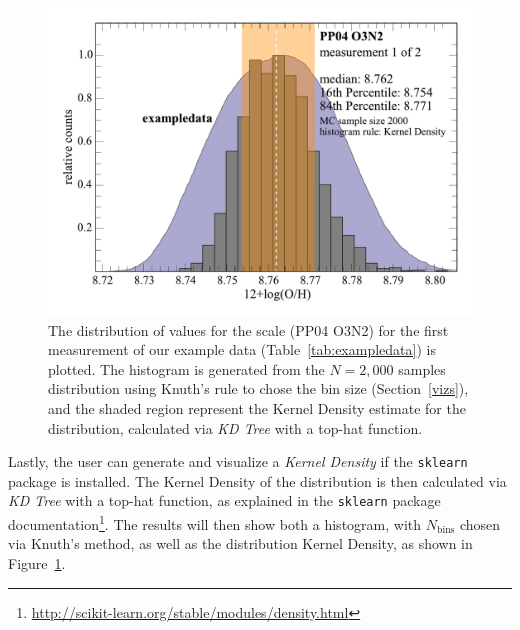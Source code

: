 \documentclass{emulateapj}
\begin{document}
\begin{figure}[ht!]
  \includegraphics[width=1.0\columnwidth]{exampledata_n2000_PP04_O3N2_1KDE.pdf}
   \caption{The distribution of values for the \citet{pettini04} scale (PP04 O3N2) for the first measurement of our example data (Table~\ref{tab:exampledata}) is plotted. The histogram is generated from the $N=2,000$ samples distribution using Knuth's rule to chose the bin size (Section~\ref{vizs}), and the shaded region represent the Kernel Density estimate for the distribution,  calculated via  \emph{KD Tree} with a top-hat function. }
\label{fig:KDE}
\end{figure}
Lastly, the user can generate and visualize a \emph{Kernel Density} if the \verb=sklearn= package is installed. The Kernel Density of the distribution is then calculated via  \emph{KD Tree} with a top-hat function, as explained in the \verb=sklearn= package documentation\footnote{\url{http://scikit-learn.org/stable/modules/density.html}}. The results will then show both a histogram, with $N_\mathrm{bins}$ chosen via Knuth's method, as well as the distribution Kernel Density, as shown in Figure~\ref{fig:KDE}.
\end{document}
